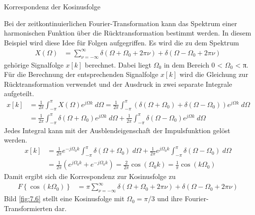 \begin{example}{Korrespondenz der Kosinusfolge}
\label{example:beispiel-korrespondenz-der-kosinusfolge}

Bei der zeitkontinuierlichen Fourier-Transformation kann das Spektrum einer harmonischen Funktion über die Rücktransformation bestimmt werden. In diesem Beispiel wird diese Idee für Folgen aufgegriffen. Es wird die zu dem Spektrum
\begin{align*}
X(\Omega) &= \sum\limits_{\nu = - \infty}^{\infty}{\delta\left( \Omega + \Omega_{0} + 2  \pi  \nu \right) + \delta\left( \Omega - \Omega_{0} + 2  \pi  \nu \right)} 
\end{align*}
gehörige Signalfolge \(x[k]\) berechnet. Dabei liegt \(Ω_{0}\) in dem Bereich 0 \textless{} \(Ω_{0}\) \textless{} π. Für die Berechnung der entsprechenden Signalfolge \(x[k]\) wird die Gleichung zur Rücktransformation verwendet und der Ausdruck in zwei separate Integrale aufgeteilt.
\begin{align*}
{x\left[k\right]} &=  {\frac{1}{2 \pi }  \int _{-\pi }^{\pi }X\left(\Omega \right) e^{j \Omega  k} {\; }d\Omega  =\frac{1}{2 \pi }  \int _{-\pi }^{\pi }\left(\delta \left(\Omega +\Omega _{0} \right)+\delta \left(\Omega -\Omega _{0} \right)\right) e^{j \Omega  k} {\; }d\Omega  } \\
{} &=  {\frac{1}{2 \pi }  \int _{-\pi }^{\pi }\delta \left(\Omega +\Omega _{0} \right) e^{j \Omega  k} {\; }d\Omega  +\frac{1}{2 \pi }  \int _{-\pi }^{\pi }\delta \left(\Omega -\Omega _{0} \right) e^{j \Omega  k} {\; }d\Omega  }
\end{align*}
Jedes Integral kann mit der Ausblendeigenschaft der Impulsfunktion gelöst werden.
\begin{align*}
{x\left[k\right]} &=  {\frac{1}{2 \pi }  e^{-j \Omega _{0}  k}  \int _{-\pi }^{\pi }\delta \left(\Omega +\Omega _{0} \right){\; }d\Omega  +\frac{1}{2 \pi }  e^{j \Omega _{0}  k}  \int _{-\pi }^{\pi }\delta \left(\Omega -\Omega _{0} \right){\; }d\Omega  } \\
{} &=  {\frac{1}{2 \pi }  \left(e^{j \Omega _{0}  k} +e^{-j \Omega _{0}  k} \right)=\frac{2}{2 \pi }  \cos \left(\Omega _{0}  k\right)=\frac{1}{\pi }  \cos \left(k \Omega _{0} \right)}
\end{align*}
Damit ergibt sich die Korrespondenz zur Kosinusfolge zu
\begin{align*}
F\left\{ \cos\left( k  \Omega_{0} \right) \right\} &= \pi  \sum\limits_{\nu = - \infty}^{\infty}{\delta\left( \Omega + \Omega_{0} + 2  \pi  \nu \right) + \delta\left( \Omega - \Omega_{0} + 2  \pi  \nu \right)} 
\end{align*}
Bild \ref{fig:7.6} stellt eine Kosinusfolge mit \(Ω_{0} = π\)/3 und ihre Fourier-Transformierten dar.


\end{example}
